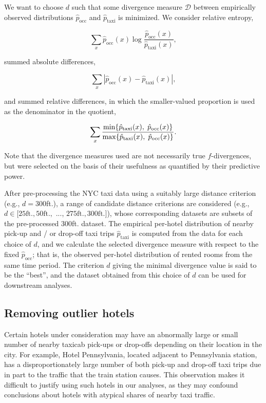 \documentclass[useAMS, usenatbib]{biom}
\begin{document}
We want to choose $d$ such that some divergence measure $\mathcal{D}$ between empirically observed distributions $\hat{p}_{\mathrm{occ}}$ and $\hat{p}_{\mathrm{taxi}}$ is minimized. We consider relative entropy,

$$\sum_x \hat{p}_{\mathrm{occ}} (x) \log \frac{\hat{p}_{\mathrm{occ}} (x)}{\hat{p}_{\mathrm{taxi}} (x)},$$

summed absolute differences,

$$\sum_x | \hat{p}_{\mathrm{occ}} (x) - \hat{p}_{\mathrm{taxi}} (x) |,$$

and summed relative differences, in which the smaller-valued proportion is used as the denominator in the quotient,

$$\sum_x \frac{\min \{ \hat{p}_{\mathrm{taxi}} (x), \hspace*{0.1cm} \hat{p}_{\mathrm{occ}} (x) \}}{\max \{ \hat{p}_{\mathrm{taxi}} (x), \hspace*{0.1cm} \hat{p}_{\mathrm{occ}} (x) \}}.$$

Note that the divergence measures used are not necessarily true $f$-divergences, but were selected on the basis of their usefulness as quantified by their predictive power. 

After pre-processing the NYC taxi data using a suitably large distance criterion (e.g., $d = 300$ft.), a range of candidate distance criterions are considered (e.g., $d \in [25 \mathrm{ft.}, 50 \mathrm{ft.},$ ..., $275 \mathrm{ft.}, 300 \mathrm{ft.}]$), whose corresponding datasets are subsets of the pre-processed 300ft. dataset. The empirical per-hotel distribution of nearby pick-up and / or drop-off taxi trips $\hat{p}_{\mathrm{taxi}}$ is computed from the data for each choice of $d$, and we calculate the selected divergence measure with respect to the fixed $\hat{p}_{\mathrm{occ}}$; that is, the observed per-hotel distribution of rented rooms from the same time period. The criterion $d$ giving the minimal divergence value is said to be the ``best'', and the dataset obtained from this choice of $d$ can be used for downstream analyses.

\subsection{Removing outlier hotels}

Certain hotels under consideration may have an abnormally large or small number of nearby taxicab pick-ups or drop-offs depending on their location in the city. For example, Hotel Pennsylvania, located adjacent to Pennsylvania station, has a disproportionately large number of both pick-up and drop-off taxi trips due in part to the traffic that the train station causes. This observation makes it difficult to justify using such hotels in our analyses, as they may confound conclusions about hotels with atypical shares of nearby taxi traffic.
\end{document}
